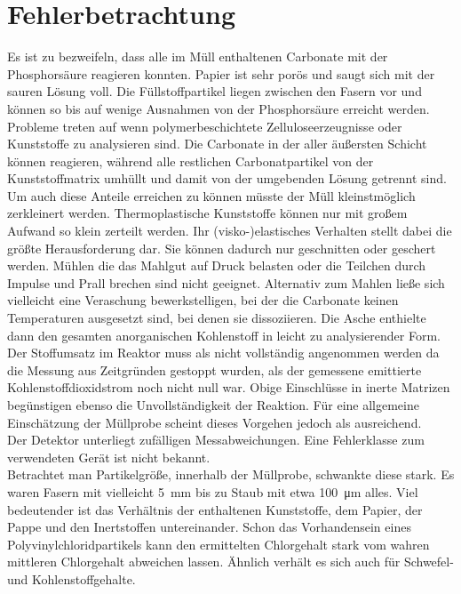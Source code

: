 \chapter{Fehlerbetrachtung}
\label{sec:fehler}

Es ist zu bezweifeln, dass alle im Müll enthaltenen Carbonate mit der Phosphorsäure reagieren konnten. Papier ist sehr porös und saugt sich mit der sauren Lösung voll. Die Füllstoffpartikel liegen zwischen den Fasern vor und können so bis auf wenige Ausnahmen von der Phosphorsäure erreicht werden. Probleme treten auf wenn polymerbeschichtete Zelluloseerzeugnisse oder Kunststoffe zu analysieren sind. Die Carbonate in der aller äußersten Schicht können reagieren, während alle restlichen Carbonatpartikel von der Kunststoffmatrix umhüllt und damit von der umgebenden Lösung getrennt sind. Um auch diese Anteile erreichen zu können müsste der Müll kleinstmöglich zerkleinert werden. Thermoplastische Kunststoffe können nur mit großem Aufwand so klein zerteilt werden. Ihr (visko-)elastisches Verhalten stellt dabei die größte Herausforderung dar. Sie können dadurch nur geschnitten oder geschert werden. Mühlen die das Mahlgut auf Druck belasten oder die Teilchen durch Impulse und Prall brechen sind nicht geeignet.
Alternativ zum Mahlen ließe sich vielleicht eine Veraschung bewerkstelligen, bei der die Carbonate keinen Temperaturen ausgesetzt sind, bei denen sie dissoziieren. Die Asche enthielte dann den gesamten anorganischen Kohlenstoff in leicht zu analysierender Form.\\
Der Stoffumsatz im Reaktor muss als nicht vollständig angenommen werden da die Messung aus Zeitgründen gestoppt wurden, als der gemessene emittierte Kohlenstoffdioxidstrom noch nicht null war. Obige Einschlüsse in inerte Matrizen begünstigen ebenso die Unvollständigkeit der Reaktion. Für eine allgemeine Einschätzung der Müllprobe scheint dieses Vorgehen jedoch als ausreichend.\\
Der Detektor unterliegt zufälligen Messabweichungen. Eine Fehlerklasse zum verwendeten Gerät ist nicht bekannt.\\
Betrachtet man Partikelgröße, innerhalb der Müllprobe, schwankte diese stark. Es waren Fasern mit vielleicht \SI{5}{\milli\meter} bis zu Staub mit etwa \SI{100}{\micro\meter} alles. Viel bedeutender ist das Verhältnis der enthaltenen Kunststoffe, dem Papier, der Pappe und den Inertstoffen untereinander. Schon das Vorhandensein eines Polyvinylchloridpartikels kann den ermittelten Chlorgehalt stark vom wahren mittleren Chlorgehalt abweichen lassen. Ähnlich verhält es sich auch für Schwefel- und Kohlenstoffgehalte.\\
